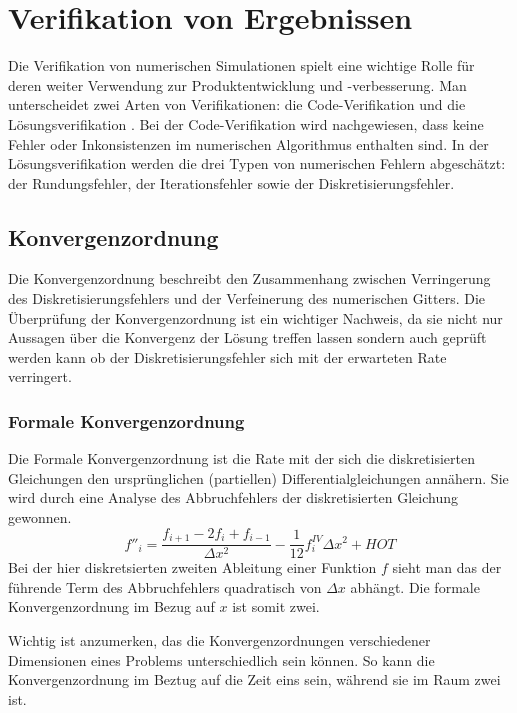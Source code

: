 \section{Verifikation von Ergebnissen}
\label{sec:verifik_allg}

Die Verifikation von numerischen Simulationen spielt eine wichtige Rolle
für deren weiter Verwendung zur Produktentwicklung und -verbesserung.
Man unterscheidet zwei Arten von Verifikationen: die Code-Verifikation und die Lösungsverifikation
\cite{veluri}.
Bei der Code-Verifikation wird nachgewiesen, dass keine Fehler oder Inkonsistenzen im numerischen
Algorithmus enthalten sind. In der Lösungsverifikation werden die drei Typen von numerischen Fehlern
abgeschätzt: der Rundungsfehler, der Iterationsfehler sowie der Diskretisierungsfehler.

\subsection{Konvergenzordnung}

Die Konvergenzordnung beschreibt den Zusammenhang zwischen Verringerung des Diskretisierungsfehlers
und der Verfeinerung des numerischen Gitters.
Die Überprüfung der Konvergenzordnung ist ein wichtiger Nachweis, da sie nicht nur Aussagen über
die Konvergenz der Lösung treffen lassen sondern auch geprüft werden kann ob der Diskretisierungsfehler
sich mit der erwarteten Rate verringert.

\subsubsection{Formale Konvergenzordnung}

Die Formale Konvergenzordnung ist die Rate mit der sich die diskretisierten Gleichungen
den ursprünglichen (partiellen) Differentialgleichungen annähern.
Sie wird durch eine Analyse des Abbruchfehlers
der diskretisierten Gleichung gewonnen.
\begin{equation}
  f''_i = \frac{f_{i+1}-2f_i +f_{i-1}}{\Delta x^2} -\frac{1}{12} f^{IV}_i \Delta x^2 + HOT
\end{equation}
Bei der hier diskretsierten zweiten Ableitung einer Funktion $f$ sieht man das der führende
Term des Abbruchfehlers quadratisch von $\Delta x$ abhängt. Die formale Konvergenzordnung im Bezug
auf $x$ ist somit zwei.

Wichtig ist anzumerken, das die Konvergenzordnungen verschiedener Dimensionen
eines Problems unterschiedlich sein können. So kann die Konvergenzordnung im Beztug auf die Zeit eins sein,
während sie im Raum zwei ist.



